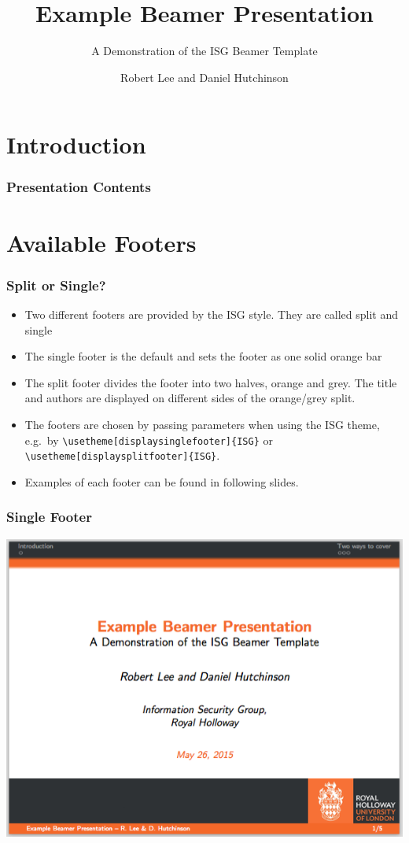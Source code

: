 \documentclass{beamer}
\title{Example Beamer Presentation}
\subtitle{A Demonstration of the ISG Beamer Template}
\author[R. Lee \& D. Hutchinson]{Robert Lee and Daniel Hutchinson}
\institute{Information Security Group,\\
Royal Holloway}
\begin{document}
\begin{frame}
\titlepage
\end{frame}
\section{Introduction}


\begin{frame}\frametitle{Presentation Contents}
\tableofcontents
\end{frame}

\section{Available Footers}
\begin{frame}\frametitle{Split or Single?}
\begin{itemize}
	\item Two different footers are provided by the ISG style.  They are called split and single
	\item The single footer is the default and sets the footer as one solid orange bar
	\item The split footer divides the footer into two halves, orange and grey.  The title and authors are displayed on different sides of the orange/grey split.
	\item The footers are chosen by passing parameters when using the ISG theme, e.g.\ by \texttt{\textbackslash usetheme[displaysinglefooter]\{ISG\}} or \texttt{\textbackslash usetheme[displaysplitfooter]\{ISG\}}.
	\item Examples of each footer can be found in following slides.
\end{itemize}
\end{frame}

\begin{frame}\frametitle{Single Footer}
\begin{center}
	\includegraphics[scale=0.4]{graphics/single-footer.png}
\end{center}
\end{frame}
\end{document}
